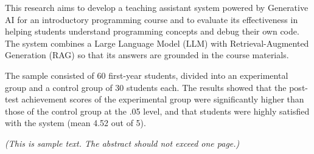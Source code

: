\begin{abstracten}
This research aims to develop a teaching assistant system powered by Generative AI for an introductory programming course and to evaluate its effectiveness in helping students understand programming concepts and debug their own code. The system combines a Large Language Model (LLM) with Retrieval-Augmented Generation (RAG) so that its answers are grounded in the course materials.

The sample consisted of 60 first-year students, divided into an experimental group and a control group of 30 students each. The results showed that the post-test achievement scores of the experimental group were significantly higher than those of the control group at the .05 level, and that students were highly satisfied with the system (mean 4.52 out of 5).

\textit{(This is sample text. The abstract should not exceed one page.)}
\end{abstracten}
